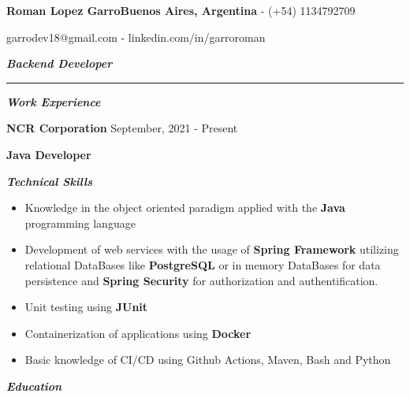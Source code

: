 \documentclass{article}
\begin{document}
\fontsize{18pt}{0pt}
\noindent\textbf{Roman Lopez Garro}\hfill\fontsize{10pt}{0pt}\textbf{Buenos Aires, Argentina} - (+54) 1134792709

\hfill garrodev18@gmail.com - linkedin.com/in/garroroman

\vspace{1mm}

\fontsize{13pt}{0pt}
\noindent\textit{\textbf{Backend Developer}}
\par\noindent\rule{\textwidth}{0.4pt}

\vspace{4mm}
\fontsize{12pt}{0pt}
\begin{center}
    \textit{\textbf{Work Experience}}
\end{center}

\vspace{1mm}
\setlength{\parindent}{11pt}\fontsize{10pt}{0pt}\textbf{NCR Corporation} \hfill September, 2021 - Present

\vspace{1mm}
\setlength{\parindent}{11pt}\fontsize{10pt}{0pt}\textbf{Java Developer}


\vspace{4mm}
\fontsize{12pt}{0pt}
\begin{center}
    \textit{\textbf{Technical Skills}}
\end{center}

\fontsize{9pt}{0pt}
\noindent
\begin{itemize}
    \item Knowledge in the object oriented paradigm applied with the \textbf{Java} programming language

    \item Development of web services with the usage of \textbf{Spring Framework} utilizing relational DataBases like \textbf{PostgreSQL} or in memory DataBases for data persistence and \textbf{Spring Security} for authorization and authentification.

    \item Unit testing using \textbf{JUnit}

    \item Containerization of applications using \textbf{Docker}

    \item Basic knowledge of CI/CD using Github Actions, Maven, Bash and Python
\end{itemize}


\vspace{4mm}
\fontsize{12pt}{0pt}
\begin{center}
    \textit{\textbf{Education}}
\end{center}
\end{document}
